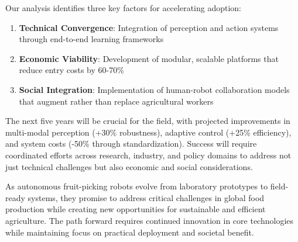 \documentclass[a4paper,fleqn]{cas-dc}
\begin{document}
Our analysis identifies three key factors for accelerating adoption:
\begin{enumerate}
\item \textbf{Technical Convergence}: Integration of perception and action systems through end-to-end learning frameworks
\item \textbf{Economic Viability}: Development of modular, scalable platforms that reduce entry costs by 60-70\%
\item \textbf{Social Integration}: Implementation of human-robot collaboration models that augment rather than replace agricultural workers
\end{enumerate}

The next five years will be crucial for the field, with projected improvements in multi-modal perception (+30\% robustness), adaptive control (+25\% efficiency), and system costs (-50\% through standardization). Success will require coordinated efforts across research, industry, and policy domains to address not just technical challenges but also economic and social considerations.

As autonomous fruit-picking robots evolve from laboratory prototypes to field-ready systems, they promise to address critical challenges in global food production while creating new opportunities for sustainable and efficient agriculture. The path forward requires continued innovation in core technologies while maintaining focus on practical deployment and societal benefit.
\end{document}
